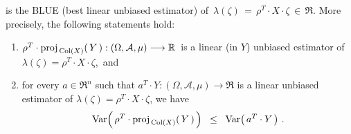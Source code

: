 \begin{theorem}
\begin{equation*}
\end{equation*}
is the BLUE (best linear unbiased estimator) of
\,$\lambda(\zeta) \,=\, \rho^{T} \cdot X \cdot \zeta \,\in\, \Re$.
More precisely, the following statements hold:
\begin{enumerate}
\item
	$\rho^{T} \cdot \textnormal{proj}_{\,\textnormal{Col}(X)}\!\left(\,Y\,\right) : (\Omega,\mathcal{A},\mu) \longrightarrow \mathbb{R}$\,
	is a linear (in $Y$) unbiased estimator of
	\,$\lambda(\zeta) = \rho^{T} \cdot X \cdot \zeta$,\, and
\item
	for every $a \in \Re^{n}$ such that
	$a^{T} \cdot Y : (\Omega,\mathcal{A},\mu) \longrightarrow \Re$
	is a linear unbiased estimator of
	$\lambda(\zeta) = \rho^{T} \cdot X \cdot \zeta$, we have
	\begin{equation*}
	\textnormal{Var}\!\left(\,\rho^{T} \cdot \textnormal{proj}_{\,\textnormal{Col}(X)}\!\left(\,Y\,\right)\,\right)
	\;\; \leq \;\;
		\textnormal{Var}\!\left(\,a^{T} \cdot Y\,\right)\,.
	\end{equation*}
\end{enumerate}
\end{theorem}
\proof
